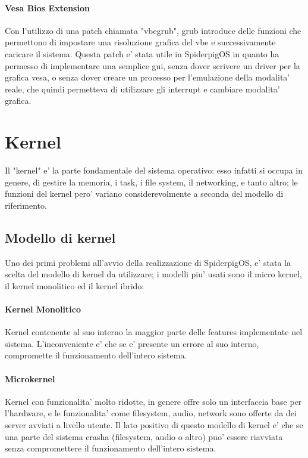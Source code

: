 \documentclass[a4paper,10pt]{book}
\begin{document}
\subsubsection{Vesa Bios Extension}
Con l'utilizzo di una patch chiamata "vbegrub", grub introduce delle funzioni che permettono di
impostare una risoluzione grafica del vbe e successivamente caricare il sistema. Questa patch
e' stata utile in SpiderpigOS in quanto ha permesso di implementare una semplice gui, senza dover
scrivere un driver per la grafica vesa, o senza dover creare un processo per l'emulazione della 
modalita' reale, che quindi permetteva di utilizzare gli interrupt e cambiare modalita' grafica.







\chapter{Kernel}
Il "kernel" e' la parte fondamentale del sistema operativo: esso infatti si occupa in genere, 
di gestire la memoria, i task, i file system, il networking, e tanto altro; le funzioni del kernel
pero' variano considerevolmente a seconda del modello di riferimento.

\section{Modello di kernel}
Uno dei primi problemi all'avvio della realizzazione di SpiderpigOS, e'
stata la scelta del modello di kernel da utilizzare; i modelli
piu' usati sono il micro kernel, il kernel monolitico ed il kernel ibrido:

\subsubsection{Kernel Monolitico}
Kernel contenente al suo interno la maggior parte delle features implementate nel sistema.
L'inconveniente e' che se e' presente un errore al suo interno, compromette il funzionamento
dell'intero sistema.

\subsubsection{Microkernel}
Kernel con funzionalita' molto ridotte, in genere offre solo un interfaccia base per l'hardware,
e le funzionalita' come filesystem, audio, network sono offerte da dei server avviati a livello utente.
Il lato positivo di questo modello di kernel e' che se una parte del sistema crasha (filesystem, audio o altro)
puo' essere riavviata senza compromettere il funzionamento dell'intero sistema.
\end{document}
